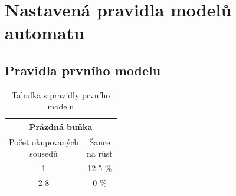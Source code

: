 \documentclass{article}
\begin{document}
\section{Nastavená pravidla modelů automatu}

\subsection{Pravidla prvního modelu}

\begin{table}[H]
    \centering
    \begin{tabular}{|c|c|} \hline
        \multicolumn{2}{|c|}{\textbf{Prázdná buňka}}                    \\ \hline
        \thead{Počet okupovaných \\ sousedů} & \thead{Šance \\ na růst} \\ \hline
         1                          &  12.5 \%                          \\ \hline
         2-8                        &     0 \%                          \\ \hline
    \end{tabular}
    \caption{Tabulka s pravidly prvního modelu}
    \label{model1table}
\end{table}
\end{document}
